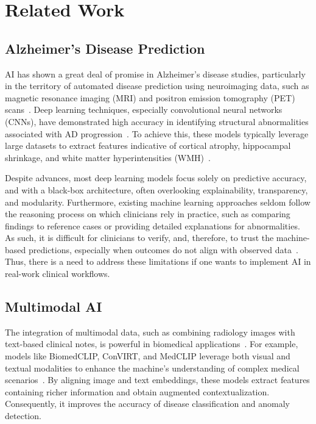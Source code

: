 \section{Related Work}
\subsection{Alzheimer's Disease Prediction}
AI has shown a great deal of promise in Alzheimer's disease studies, particularly in the territory of automated disease prediction using neuroimaging data, such as magnetic resonance imaging (MRI) and positron emission tomography (PET) scans~\cite{jack2018nia, menagadevi2024machine, illakiya2023automatic, yao2023artificial, warren2023functional, ebrahimighahnavieh2020deep, frizzell2022artificial}. Deep learning techniques, especially convolutional neural networks (CNNs), have demonstrated high accuracy in identifying structural abnormalities associated with AD progression~\cite{menagadevi2024machine, illakiya2023automatic, abdulazeem2021cnn, farooq2017deep, khagi20203d, folego2020alzheimer, el2024novel, hu2023conv, basaia2019automated}. To achieve this, these models typically leverage large datasets to extract features indicative of cortical atrophy, hippocampal shrinkage, and white matter hyperintensities (WMH)~\cite{weiner2013alzheimer, dadar2022white}.

Despite advances, most deep learning models focus solely on predictive accuracy, and with a black-box architecture, often overlooking explainability, transparency, and modularity.
Furthermore, existing machine learning approaches seldom follow the reasoning process on which clinicians rely in practice, such as comparing findings to reference cases or providing detailed explanations for abnormalities. 
As such, it is difficult for clinicians to verify, and, therefore, to trust the machine-based predictions, especially when outcomes do not align with observed data~\cite{ghassemi2021false, arrieta2020explainable}. Thus, there is a need to address these limitations if one wants to implement AI in real-work clinical workflows.

\subsection{Multimodal AI}
The integration of multimodal data, such as combining radiology images with text-based clinical notes, is powerful in biomedical applications~\cite{soenksen2022integrated, acosta2022multimodal, alsaad2024multimodal}. For example, models like BiomedCLIP, ConVIRT, and MedCLIP leverage both visual and textual modalities to enhance the machine's understanding of complex medical scenarios~\cite{zhang2022contrastive, wang2022medclip, zhang2024biomedclip}. By aligning image and text embeddings, these models extract features containing richer information and obtain augmented contextualization. Consequently, it improves the accuracy of disease classification and anomaly detection.

